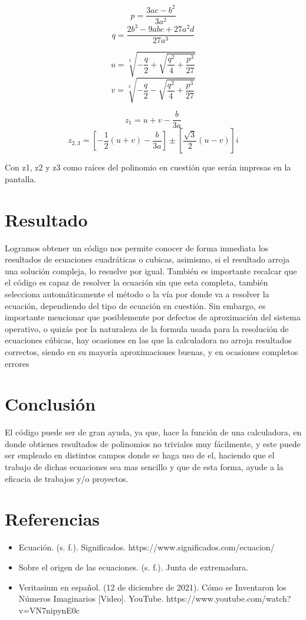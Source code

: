 \documentclass[12pt,letterpaper]{article}
\begin{document}
\begin{enumerate}
    $$p = \frac{3ac-b^2}{3a^2}$$
    $$q = \frac{2b^{3}-9abc+27a^{2}d}{27a^3}$$
    
    $$u = \sqrt[3]{-\frac{q}{2} +\sqrt{\frac{q^2}{4} + \frac{p^3}{27} } } $$
    $$v = \sqrt[3]{-\frac{q}{2} -\sqrt{\frac{q^2}{4} + \frac{p^3}{27} } } $$

    $$ z_1 = u+v -\frac{b}{3a}$$
    $$ z_{2,3} = \left[ -\frac{1}{2}(u+v) -\frac{b}{3a} \right] \pm \left[\frac{\sqrt{3}}{2}(u-v) \right]i$$

    Con z1, z2 y z3 como raíces del polinomio en cuestión que serán impresas en la pantalla.
    
\end{enumerate}

\section{Resultado}
\noindent Logramos obtener un código nos permite conocer de forma inmediata los resultados de ecuaciones cuadráticas o cubicas, asimismo, si el resultado arroja una solución compleja, lo resuelve por igual.  También es importante recalcar que el código es capaz de resolver la ecuación sin que esta completa, también selecciona automáticamente el método o la vía por donde va a resolver la ecuación, dependiendo del tipo de ecuación en cuestión. Sin embargo, es importante mencionar que posiblemente por defectos de aproximación del sistema operativo, o quizás por la naturaleza de la formula usada para la resolución de ecuaciones cúbicas, hay ocasiones en las que la calculadora no arroja resultados correctos, siendo en su mayoría aproximaciones buenas, y en ocasiones completos errores
\section{Conclusión}
\noindent El código puede ser de gran ayuda, ya que, hace la función de una calculadora, en donde obtienes resultados de polinomios no triviales muy fácilmente, y este puede ser empleado en distintos campos donde se haga uso de el, haciendo que el trabajo de dichas ecuaciones sea mas sencillo y que de esta forma, ayude a la eficacia de trabajos y/o proyectos. 

\section{Referencias}

\begin{itemize}
    \item Ecuación. (s. f.). Significados. https://www.significados.com/ecuacion/
    \item Sobre el origen de las ecuaciones. (s. f.). Junta de extremadura.
    \item Veritasium en español. (12 de diciembre de 2021). Cómo se Inventaron los Números Imaginarios [Video]. YouTube. https://www.youtube.com/watch?v=VN7nipynE0c
\end{itemize}
\end{document}

